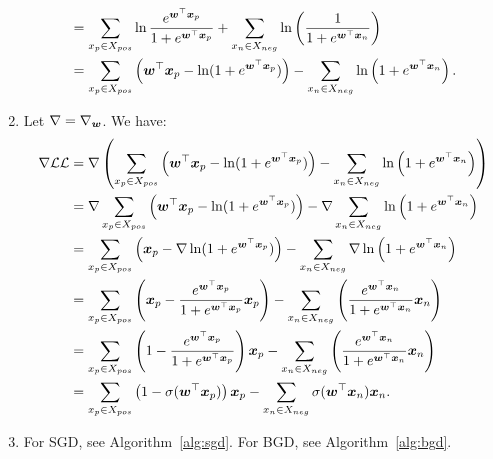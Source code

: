 \documentclass[11pt,a4paper]{article}
\begin{document}
\begin{enumerate}[label=(\alph*)]
\begin{align}
                                  & = \sum_{x_p\in X_{pos}}\ln \frac{e^{{\boldsymbol{w}}^\top{\boldsymbol{x}}_p}}{1 + e^{{\boldsymbol{w}}^\top{\boldsymbol{x}}_p}} + \sum_{x_n\in X_{neg}}\ln\left(\frac{1}{1 + e^{{\boldsymbol{w}}^\top{\boldsymbol{x}}_n}}\right)                     \\
                                  & = \sum_{x_p\in X_{pos}} \left({\boldsymbol{w}}^\top{\boldsymbol{x}}_p - \ln(1 + e^{{\boldsymbol{w}}^\top{\boldsymbol{x}}_p})\right) - \sum_{x_n\in X_{neg}}\ln\left(1 + e^{{\boldsymbol{w}}^\top{\boldsymbol{x}}_n}\right).
          \end{align}
    \item Let $\nabla=\nabla_{{\boldsymbol{w}}}$. We have:
          \begin{align}
              \nabla\mathcal{LL} & = \nabla \left(\sum_{x_p\in X_{pos}} \left({\boldsymbol{w}}^\top{\boldsymbol{x}}_p - \ln(1 + e^{{\boldsymbol{w}}^\top{\boldsymbol{x}}_p})\right) - \sum_{x_n\in X_{neg}}\ln\left(1 + e^{{\boldsymbol{w}}^\top{\boldsymbol{x}}_n}\right)\right)                           \\
                             & = \nabla\sum_{x_p\in X_{pos}} \left({\boldsymbol{w}}^\top{\boldsymbol{x}}_p - \ln(1 + e^{{\boldsymbol{w}}^\top{\boldsymbol{x}}_p})\right) - \nabla\sum_{x_n\in X_{neg}}\ln\left(1 + e^{{\boldsymbol{w}}^\top{\boldsymbol{x}}_n}\right)                                   \\
                             & = \sum_{x_p\in X_{pos}} \left({\boldsymbol{x}}_p - \nabla\ln(1 + e^{{\boldsymbol{w}}^\top{\boldsymbol{x}}_p})\right) - \sum_{x_n\in X_{neg}}\nabla\ln\left(1 + e^{{\boldsymbol{w}}^\top{\boldsymbol{x}}_n}\right)                                           \\
                             & = \sum_{x_p\in X_{pos}} \left({\boldsymbol{x}}_p - \frac{e^{{\boldsymbol{w}}^\top{\boldsymbol{x}}_p}}{1 + e^{{\boldsymbol{w}}^\top{\boldsymbol{x}}_p}}{\boldsymbol{x}}_p\right) - \sum_{x_n\in X_{neg}}\left(\frac{e^{{\boldsymbol{w}}^\top{\boldsymbol{x}}_n}}{1 + e^{{\boldsymbol{w}}^\top{\boldsymbol{x}}_n}}{\boldsymbol{x}}_n\right) \\
                             & = \sum_{x_p\in X_{pos}} \left(1 - \frac{e^{{\boldsymbol{w}}^\top{\boldsymbol{x}}_p}}{1 + e^{{\boldsymbol{w}}^\top{\boldsymbol{x}}_p}}\right){\boldsymbol{x}}_p - \sum_{x_n\in X_{neg}}\left(\frac{e^{{\boldsymbol{w}}^\top{\boldsymbol{x}}_n}}{1 + e^{{\boldsymbol{w}}^\top{\boldsymbol{x}}_n}}{\boldsymbol{x}}_n\right)     \\
                             & = \sum_{x_p\in X_{pos}} \left(1 - \sigma({\boldsymbol{w}}^\top{\boldsymbol{x}}_p)\right){\boldsymbol{x}}_p - \sum_{x_n\in X_{neg}}\sigma({\boldsymbol{w}}^\top{\boldsymbol{x}}_n){\boldsymbol{x}}_n.
          \end{align}
    \item For SGD, see Algorithm~\ref{alg:sgd}. For BGD, see
          Algorithm~\ref{alg:bgd}.


\end{enumerate}
\end{document}
